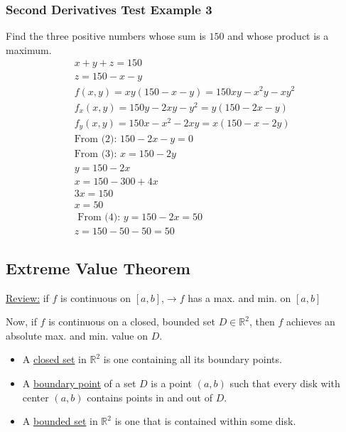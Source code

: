 \documentclass[12pt]{article}
\begin{document}
\subsubsection{Second Derivatives Test Example 3}
Find the three positive numbers whose sum is \(150\) and whose product is a maximum.
\begin{align}
	\nonumber x + y + z = 150 \\
	\nonumber z = 150 - x - y \\
	f(x,y) = xy(150 - x - y) = 150xy -x^2y - xy^2 \\
	f_x(x,y) = 150y - 2xy - y^2 = y(150 - 2x - y)\\
	f_y(x,y) = 150x - x^2 - 2xy = x(150 - x - 2y)\\
	\nonumber \text{From (2): } 150 - 2x - y = 0 \\
	\nonumber \text{From (3): } x = 150 - 2y \\
	y = 150 - 2x \\
	\nonumber x = 150 - 300 + 4x \\	
	\nonumber 3x = 150 \\
	x = 50 \\
	\nonumber \text{ From (4): } y = 150-2x = 50 \\
	z = 150 - 50 - 50 = 50 
\end{align}
\fbox{
	\begin{minipage}{2in}
		\[
			\therefore x = 50, y = 50, z = 50
		\]
	\end{minipage}
}

\subsection{Extreme Value Theorem}
\underline{Review:} if \(f\) is continuous on \([a,b]\),\(\rightarrow  f\) has a max. and min. on \([a,b]\)  

Now, if \(f\) is continuous on a closed, bounded set \(D \in \mathbb{R}^2\), then \(f\)  achieves an absolute max. and min. value on \(D\).  
\begin{itemize}
	\item A \underline{closed set} in \(\mathbb{R}^2 \) is one containing all its boundary points.
	\item A \underline{boundary point} of a set \(D\)  is a point \((a,b)\) such that every disk with center \((a,b)\) contains points in and out of \(D\). 
	\item A \underline{bounded set} in \(\mathbb{R}^2\) is one that is contained within some disk.
\end{itemize}
\end{document}
